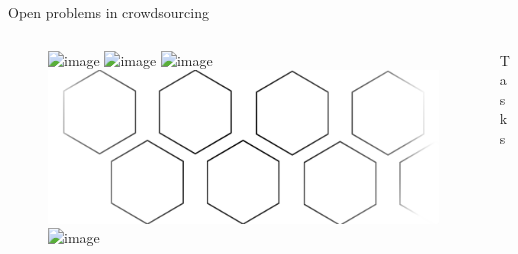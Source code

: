 \documentclass[presentation]{subfiles}
\begin{document}
\begin{frame}{Open problems in crowdsourcing}
\begin{columns}
\begin{column}[T]{0.25\textwidth}
\begin{figure}
\begin{overlayarea}{\textwidth}{\textheight}
      \includegraphics<2->[width=.4\textwidth]{figures/complexity/geodesic.png}
      \includegraphics<4->[width=.3\textwidth]{figures/complexity/paper_resized.png}
      \includegraphics<4->[width=.3\textwidth]{figures/complexity/chair_resized.png}
      \vspace{5mm}
      \includegraphics[width=\textwidth]{figures/complexity/hexblend.png}
      \vspace{5mm}
      \includegraphics<3->[width=\textwidth]{figures/complexity/decompose.png}
    \end{overlayarea}
  \end{figure}
\end{column}

\begin{column}[T]{0.25\textwidth}
\centering
\vspace{8mm}



\vspace{8mm}



\small{Tasks}

\vspace{11mm}


\end{column}
\end{columns}
\end{frame}
\end{document}
